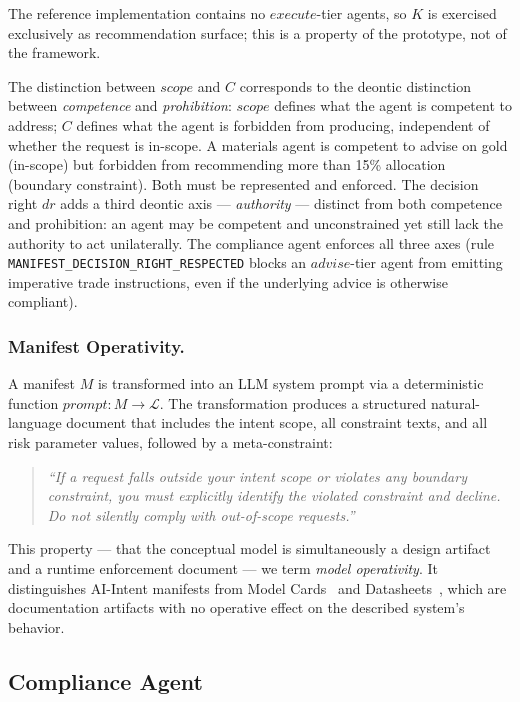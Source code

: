 \documentclass[runningheads]{llncs}
\begin{document}
The reference implementation contains no $\mathit{execute}$-tier
agents, so $K$ is exercised exclusively as recommendation surface;
this is a property of the prototype, not of the framework.

The distinction between $\mathit{scope}$ and $C$ corresponds to the
deontic distinction between \emph{competence} and \emph{prohibition}:
$\mathit{scope}$ defines what the agent is competent to address;
$C$ defines what the agent is forbidden from producing, independent
of whether the request is in-scope. A materials agent is competent to
advise on gold (in-scope) but forbidden from recommending more than 15\%
allocation (boundary constraint). Both must be represented and enforced.
The decision right $\mathit{dr}$ adds a third deontic axis ---
\emph{authority} --- distinct from both competence and prohibition: an
agent may be competent and unconstrained yet still lack the authority
to act unilaterally. The compliance agent enforces all three axes
(rule \texttt{MANIFEST\_DECISION\_RIGHT\_RESPECTED} blocks an
$\mathit{advise}$-tier agent from emitting imperative trade
instructions, even if the underlying advice is otherwise compliant).

\subsubsection{Manifest Operativity.}

A manifest $M$ is transformed into an LLM system prompt via a
deterministic function $\mathit{prompt}: M \rightarrow \mathcal{L}$. The
transformation produces a structured natural-language document that
includes the intent scope, all constraint texts, and all risk parameter
values, followed by a meta-constraint:

\begin{quote}
\itshape ``If a request falls outside your intent scope or violates any
boundary constraint, you must explicitly identify the violated constraint
and decline. Do not silently comply with out-of-scope requests.''
\end{quote}

This property --- that the conceptual model is simultaneously a design
artifact and a runtime enforcement document --- we term \emph{model
operativity}. It distinguishes AI-Intent manifests from Model
Cards~\cite{mitchell2019model} and Datasheets~\cite{gebru2021datasheets},
which are documentation artifacts with no operative effect on the
described system's behavior.

\subsection{Compliance Agent}
\label{sec:compliance}
\end{document}
